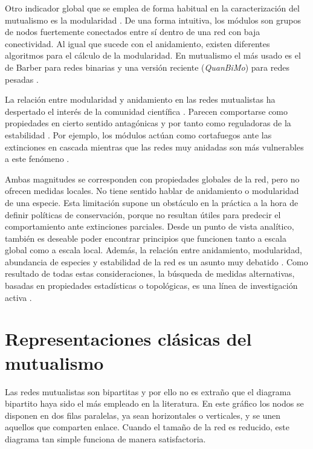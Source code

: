 Otro indicador global que se emplea de forma habitual en la caracterización del mutualismo es la modularidad \cite{newman2004finding, olesen2007modularity}. De una forma intuitiva, los módulos son grupos de nodos fuertemente conectados entre sí dentro de una red con baja conectividad.
Al igual que sucede con el anidamiento, existen diferentes algoritmos para el cálculo de la modularidad. En mutualismo el
más usado es el de Barber para redes binarias \cite{barber2007modularity} y una versión reciente (\textit{QuanBiMo}) para redes pesadas \cite{dormann2014method}.

La relación entre modularidad y anidamiento en las redes mutualistas ha despertado el interés de la comunidad científica \cite{olesen2007modularity, dupont2009ecological}. Parecen comportarse como propiedades en cierto sentido antagónicas y por tanto como reguladoras de la estabilidad \cite{fortuna2010nestedness}. Por ejemplo, los módulos actúan como cortafuegos ante las extinciones en cascada \cite{saavedra2011strong} mientras que las redes muy anidadas son más vulnerables a este fenómeno \cite{lever2014sudden}. 

Ambas magnitudes se corresponden con propiedades globales de la red, pero no ofrecen medidas locales. No tiene sentido hablar de anidamiento o modularidad de una especie. Esta limitación supone un obstáculo en la práctica a la hora de definir políticas de conservación, porque no resultan útiles para predecir el comportamiento ante extinciones parciales. Desde un punto de vista analítico, también es deseable poder encontrar principios que funcionen tanto a escala global como a escala local. 
Además, la relación entre anidamiento, modularidad, abundancia de especies y estabilidad de la red es un asunto muy debatido \cite{fortuna2010nestedness, james2012disentangling, staniczenko2013ghost, feng2014heterogeneity}. Como resultado de todas estas consideraciones, la búsqueda de medidas alternativas, basadas en propiedades estadísticas o topológicas, es una línea de investigación activa \cite{podani2014new,chagnon2015characterizing,strona2015new}.

\section{Representaciones clásicas del mutualismo}

Las redes mutualistas son bipartitas y por ello no es extraño que el diagrama bipartito haya sido el más empleado en la literatura. En este 
gráfico los nodos se disponen en dos filas paralelas, ya sean horizontales o verticales, y se unen aquellos que comparten enlace. Cuando el tamaño
de la red es reducido, este diagrama tan simple funciona de manera satisfactoria.

